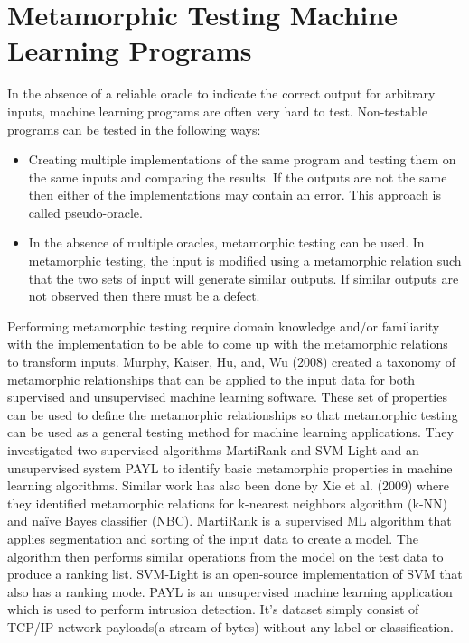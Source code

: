 \section{Metamorphic Testing Machine Learning Programs}

In the absence of a reliable oracle to indicate the correct output for arbitrary inputs, machine learning programs are often very hard to test. Non-testable programs can be tested in the following ways:
\begin{itemize}
  \item Creating multiple implementations of the same program and testing them on the same inputs and comparing the results. If the outputs are not the same then either of the implementations may contain an error. This approach is called pseudo-oracle.
  \item In the absence of multiple oracles, metamorphic testing can be used. In metamorphic testing, the input is modified using a metamorphic relation such that the two sets of input will generate similar outputs. If similar outputs are not observed then there must be a defect.
\end{itemize}

Performing metamorphic testing require domain knowledge and/or familiarity with the implementation to be able to come up with the metamorphic relations to transform inputs. Murphy, Kaiser, Hu, and, Wu (2008) created a taxonomy of metamorphic relationships that can be applied to the input data for both supervised and unsupervised machine learning software. These set of properties can be used to define the metamorphic relationships so that metamorphic testing can be used as a general testing method for machine learning applications\cite{Murphy2008}. They investigated two supervised algorithms MartiRank and SVM-Light and an unsupervised system PAYL to identify basic metamorphic properties in machine learning algorithms. Similar work has also been done by Xie et al. (2009) where they identified metamorphic relations for k-nearest neighbors algorithm (k-NN) and naïve Bayes classifier (NBC).
MartiRank is a supervised ML algorithm that applies segmentation and sorting of the input data to create a model. The algorithm then performs similar operations from the model on the test data to produce a ranking list. 
SVM-Light is an open-source implementation of SVM that also has a ranking mode.
PAYL is an unsupervised machine learning application which is used to perform intrusion detection. It's dataset simply consist of TCP/IP network payloads(a stream of bytes) without any label or classification.

